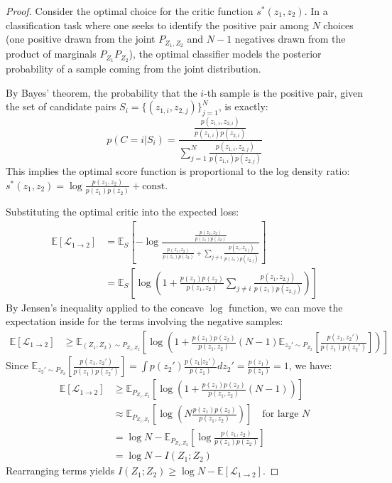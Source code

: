 \begin{proof}
Consider the optimal choice for the critic function $s^*(z_1, z_2)$. In a classification task where one seeks to identify the positive pair among $N$ choices (one positive drawn from the joint $P_{Z_1, Z_2}$ and $N-1$ negatives drawn from the product of marginals $P_{Z_1}P_{Z_2}$), the optimal classifier models the posterior probability of a sample coming from the joint distribution. 

By Bayes' theorem, the probability that the $i$-th sample is the positive pair, given the set of candidate pairs $S_i = \{ (z_{1,i}, z_{2,j}) \}_{j=1}^N$, is exactly:
\begin{equation}
    p(C=i | S_i) = \frac{\frac{p(z_{1,i}, z_{2,i})}{p(z_{1,i})p(z_{2,i})}}{\sum_{j=1}^N \frac{p(z_{1,i}, z_{2,j})}{p(z_{1,i})p(z_{2,j})}}
\end{equation}
This implies the optimal score function is proportional to the log density ratio: $s^*(z_1, z_2) = \log \frac{p(z_1, z_2)}{p(z_1)p(z_2)} + \text{const}$.

Substituting the optimal critic into the expected loss:
\begin{align*}
    \mathbb{E}\left[\mathcal{L}_{1 \to 2}\right] &= \mathbb{E}_{S} \left[ - \log \frac{\frac{p(z_1, z_2)}{p(z_1)p(z_2)}}{\frac{p(z_1, z_2)}{p(z_1)p(z_2)} + \sum_{j \neq i} \frac{p(z_1, z_{2,j})}{p(z_1)p(z_{2,j})}} \right] \\
    &= \mathbb{E}_{S} \left[ \log \left( 1 + \frac{p(z_1)p(z_2)}{p(z_1, z_2)} \sum_{j \neq i} \frac{p(z_1, z_{2,j})}{p(z_1)p(z_{2,j})} \right) \right]
\end{align*}
By Jensen's inequality applied to the concave $\log$ function, we can move the expectation inside for the terms involving the negative samples:
\begin{align*}
    \mathbb{E}\left[\mathcal{L}_{1 \to 2}\right] &\ge \mathbb{E}_{(Z_1,Z_2)\sim P_{Z_1, Z_2}} \left[ \log \left( 1 + \frac{p(z_1)p(z_2)}{p(z_1, z_2)} (N-1) \mathbb{E}_{z_{2}' \sim P_{Z_2}} \left[ \frac{p(z_1, z_{2}')}{p(z_1)p(z_{2}')} \right] \right) \right]
\end{align*}
Since $\mathbb{E}_{z_{2}' \sim P_{Z_2}} \left[ \frac{p(z_1, z_{2}')}{p(z_1)p(z_{2}')} \right] = \int p(z_{2}') \frac{p(z_1|z_{2}')}{p(z_1)} dz_{2}' = \frac{p(z_1)}{p(z_1)} = 1$, we have:
\begin{align*}
    \mathbb{E}\left[\mathcal{L}_{1 \to 2}\right] &\ge \mathbb{E}_{P_{Z_1, Z_2}} \left[ \log \left( 1 + \frac{p(z_1)p(z_2)}{p(z_1, z_2)} (N-1) \right) \right] \\
    &\approx \mathbb{E}_{P_{Z_1, Z_2}} \left[ \log \left( N \frac{p(z_1)p(z_2)}{p(z_1, z_2)} \right) \right] \quad \text{for large } N \\
    &= \log N - \mathbb{E}_{P_{Z_1, Z_2}} \left[ \log \frac{p(z_1, z_2)}{p(z_1)p(z_2)} \right] \\
    &= \log N - I(Z_1; Z_2)
\end{align*}
Rearranging terms yields $I(Z_1; Z_2) \ge \log N - \mathbb{E}\left[\mathcal{L}_{1 \to 2}\right]$.
\end{proof}

